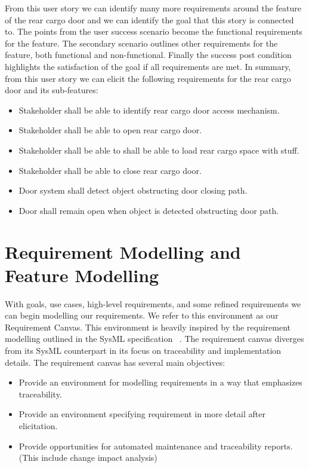 From this user story we can identify many more requirements around the feature of the rear cargo door and we can identify the goal that this story is connected to. The points from the user success scenario become the functional requirements for the feature. The secondary scenario outlines other requirements for the feature, both functional and non-functional. Finally the success post condition highlights the satisfaction of the goal if all requirements are met. In summary, from this user story we can elicit the following requirements for the rear cargo door and its sub-features:
\begin{itemize}
	\item Stakeholder shall be able to identify rear cargo door access mechanism.
	\item Stakeholder shall be able to open rear cargo door.
	\item Stakeholder shall be able to shall be able to load rear cargo space with stuff.
	\item Stakeholder shall be able to close rear cargo door.
	\item Door system shall detect object obstructing door closing path. 
	\item Door shall remain open when object is detected obstructing door path.
\end{itemize}

\section{Requirement Modelling and Feature Modelling}

With goals, use cases, high-level requirements, and some refined requirements we can begin modelling our requirements. We refer to this environment as our Requirement Canvas. This environment is heavily inspired by the requirement modelling outlined in the SysML specification ~\cite{sysml2019omg}. The requirement canvas diverges from its SysML counterpart in its focus on traceability and implementation details. The requirement canvas has several main objectives:
\begin{itemize}
	\item Provide an environment for modelling requirements in a way that emphasizes traceability.
	\item Provide an environment specifying requirement in more detail after elicitation.
	\item Provide opportunities for automated maintenance and traceability reports. (This include change impact analysis)
\end{itemize}  

